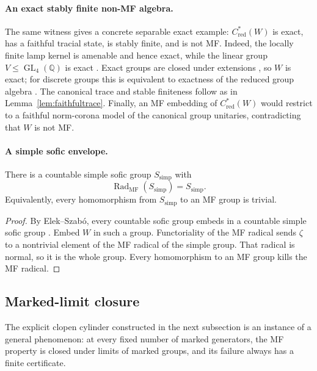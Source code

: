 \documentclass[11pt]{amsart}
\theoremstyle{definition}
\theoremstyle{remark}
\theoremstyle{plain}
\newcommand{\GL}{\operatorname{GL}}
\newcommand{\Cred}{C^*_{\mathrm{red}}}
\begin{document}
\paragraph{An exact stably finite non-MF algebra.}
The same witness gives a concrete separable exact example:
$\Cred(W)$ is exact, has a faithful tracial state, is stably finite, and is
not MF\@.  Indeed, the locally finite lamp kernel is amenable and hence exact,
while the linear group $V\leq\GL_4(\mathbb Q)$ is exact
\cite{GHW}.  Exact groups are closed under extensions
\cite{KWPermanence}, so $W$ is exact; for discrete groups this is equivalent
to exactness of the reduced group algebra \cite{KWExact}.  The canonical trace
and stable finiteness follow as in Lemma~\ref{lem:faithfultrace}.  Finally, an
MF embedding of $\Cred(W)$ would restrict to a faithful norm-corona model of
the canonical group unitaries, contradicting that $W$ is not MF\@.

\paragraph{A simple sofic envelope.}
There is a countable simple sofic group $S_{\mathrm{simp}}$ with
\[
 \operatorname{Rad}_{\mathrm{MF}}(S_{\mathrm{simp}})=S_{\mathrm{simp}}.
\]
Equivalently, every homomorphism from $S_{\mathrm{simp}}$ to an MF group is
trivial.

\begin{proof}
By Elek--Szab\'o, every countable sofic group embeds in a countable simple
sofic group \cite[Theorem~1]{ElekSzaboHyper}.  Embed $W$ in such a group.  Functoriality
of the MF radical sends $\zeta$ to a nontrivial element of the
MF radical of the simple group.  That radical is normal, so it is the whole
group.  Every homomorphism to an MF group kills the MF radical.
\end{proof}


\subsection{Marked-limit closure}

The explicit clopen cylinder constructed in the next subsection is an
instance of a general phenomenon: at every fixed number of marked
generators, the MF property is closed under limits of marked groups,
and its failure always has a finite certificate.
\end{document}
